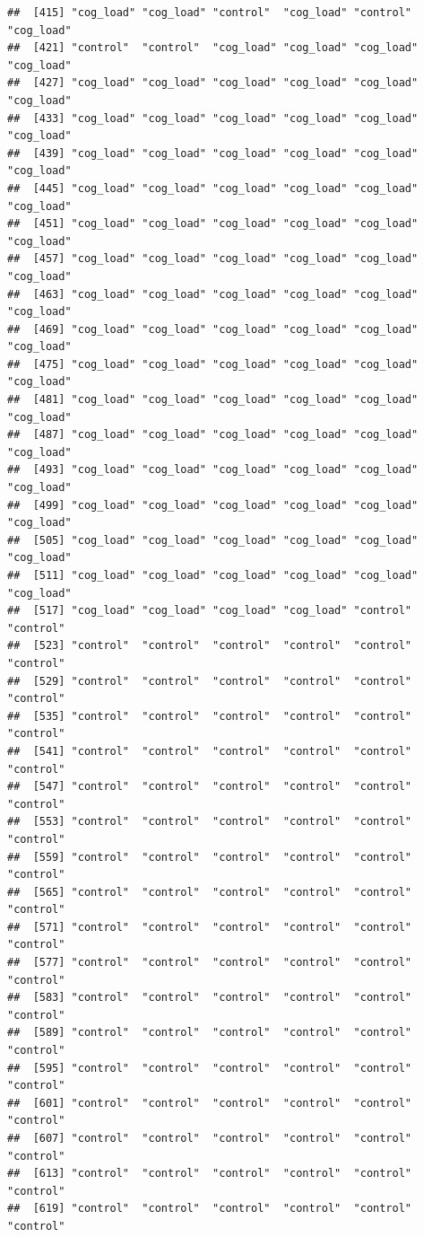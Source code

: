 \documentclass[
  american,
  man,floatsintext]{apa7}
\begin{document}
\begin{verbatim}
##  [415] "cog_load" "cog_load" "control"  "cog_load" "control"  "cog_load"
##  [421] "control"  "control"  "cog_load" "cog_load" "cog_load" "cog_load"
##  [427] "cog_load" "cog_load" "cog_load" "cog_load" "cog_load" "cog_load"
##  [433] "cog_load" "cog_load" "cog_load" "cog_load" "cog_load" "cog_load"
##  [439] "cog_load" "cog_load" "cog_load" "cog_load" "cog_load" "cog_load"
##  [445] "cog_load" "cog_load" "cog_load" "cog_load" "cog_load" "cog_load"
##  [451] "cog_load" "cog_load" "cog_load" "cog_load" "cog_load" "cog_load"
##  [457] "cog_load" "cog_load" "cog_load" "cog_load" "cog_load" "cog_load"
##  [463] "cog_load" "cog_load" "cog_load" "cog_load" "cog_load" "cog_load"
##  [469] "cog_load" "cog_load" "cog_load" "cog_load" "cog_load" "cog_load"
##  [475] "cog_load" "cog_load" "cog_load" "cog_load" "cog_load" "cog_load"
##  [481] "cog_load" "cog_load" "cog_load" "cog_load" "cog_load" "cog_load"
##  [487] "cog_load" "cog_load" "cog_load" "cog_load" "cog_load" "cog_load"
##  [493] "cog_load" "cog_load" "cog_load" "cog_load" "cog_load" "cog_load"
##  [499] "cog_load" "cog_load" "cog_load" "cog_load" "cog_load" "cog_load"
##  [505] "cog_load" "cog_load" "cog_load" "cog_load" "cog_load" "cog_load"
##  [511] "cog_load" "cog_load" "cog_load" "cog_load" "cog_load" "cog_load"
##  [517] "cog_load" "cog_load" "cog_load" "cog_load" "control"  "control" 
##  [523] "control"  "control"  "control"  "control"  "control"  "control" 
##  [529] "control"  "control"  "control"  "control"  "control"  "control" 
##  [535] "control"  "control"  "control"  "control"  "control"  "control" 
##  [541] "control"  "control"  "control"  "control"  "control"  "control" 
##  [547] "control"  "control"  "control"  "control"  "control"  "control" 
##  [553] "control"  "control"  "control"  "control"  "control"  "control" 
##  [559] "control"  "control"  "control"  "control"  "control"  "control" 
##  [565] "control"  "control"  "control"  "control"  "control"  "control" 
##  [571] "control"  "control"  "control"  "control"  "control"  "control" 
##  [577] "control"  "control"  "control"  "control"  "control"  "control" 
##  [583] "control"  "control"  "control"  "control"  "control"  "control" 
##  [589] "control"  "control"  "control"  "control"  "control"  "control" 
##  [595] "control"  "control"  "control"  "control"  "control"  "control" 
##  [601] "control"  "control"  "control"  "control"  "control"  "control" 
##  [607] "control"  "control"  "control"  "control"  "control"  "control" 
##  [613] "control"  "control"  "control"  "control"  "control"  "control" 
##  [619] "control"  "control"  "control"  "control"  "control"  "control" 

\end{verbatim}
\end{document}
